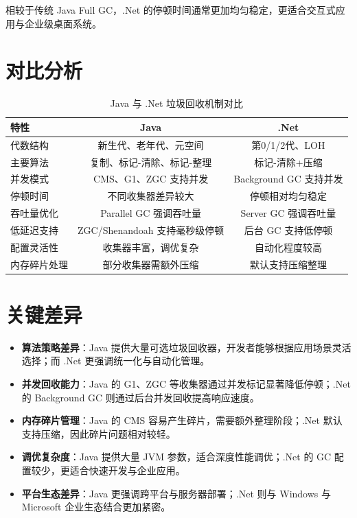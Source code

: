 相较于传统 Java Full GC，.Net 的停顿时间通常更加均匀稳定，更适合交互式应用与企业级桌面系统。

\section{对比分析}

\begin{table}[h]
\centering
\small
\begin{tabular}{|l|c|c|}
\hline
\textbf{特性} & \textbf{Java} & \textbf{.Net} \\
\hline
代数结构 & 新生代、老年代、元空间 & 第0/1/2代、LOH \\
\hline
主要算法 & 复制、标记-清除、标记-整理 & 标记-清除+压缩 \\
\hline
并发模式 & CMS、G1、ZGC 支持并发 & Background GC 支持并发 \\
\hline
停顿时间 & 不同收集器差异较大 & 停顿相对均匀稳定 \\
\hline
吞吐量优化 & Parallel GC 强调吞吐量 & Server GC 强调吞吐量 \\
\hline
低延迟支持 & ZGC/Shenandoah 支持毫秒级停顿 & 后台 GC 支持低停顿 \\
\hline
配置灵活性 & 收集器丰富，调优复杂 & 自动化程度较高 \\
\hline
内存碎片处理 & 部分收集器需额外压缩 & 默认支持压缩整理 \\
\hline
\end{tabular}
\caption{Java 与 .Net 垃圾回收机制对比}
\end{table}

\section{关键差异}

\begin{itemize}
    \item \textbf{算法策略差异}：Java 提供大量可选垃圾回收器，开发者能够根据应用场景灵活选择；而 .Net 更强调统一化与自动化管理。
    
    \item \textbf{并发回收能力}：Java 的 G1、ZGC 等收集器通过并发标记显著降低停顿；.Net 的 Background GC 则通过后台并发回收提高响应速度。
    
    \item \textbf{内存碎片管理}：Java 的 CMS 容易产生碎片，需要额外整理阶段；.Net 默认支持压缩，因此碎片问题相对较轻。
    
    \item \textbf{调优复杂度}：Java 提供大量 JVM 参数，适合深度性能调优；.Net 的 GC 配置较少，更适合快速开发与企业应用。
    
    \item \textbf{平台生态差异}：Java 更强调跨平台与服务器部署；.Net 则与 Windows 与 Microsoft 企业生态结合更加紧密。
\end{itemize}

